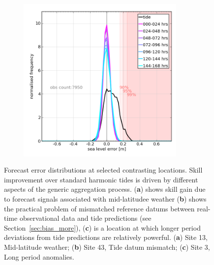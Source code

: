 \begin{figure}[H]
\begin{subfigure}{0.30\textwidth}
    \caption{}
    \end{subfigure}
    \begin{subfigure}{0.30\textwidth}
    \includegraphics[width=0.9\textwidth]{figures/plots/0003_verify_pdf.png}
    \caption{}
    \end{subfigure}
    \caption{ Forecast error distributions at selected contrasting locations. Skill improvement over standard harmonic tides is driven by different aspects of the generic aggregation process. (\textbf{a}) shows skill gain due to forecast signals associated with mid-latitudee weather (\textbf{b}) shows the practical problem of mismatched reference datums between real-time observational data and tide predictions (see Section~\ref{sec:bias_more}), (\textbf{c}) is a location at which longer period deviations from tide predictions are relatively powerful. (\textbf{a}) Site 13, Mid-latitude weather; (\textbf{b}) Site 43, Tide datum mismatch; (\textbf{c}) Site 3, Long period anomalies.}\vspace{-17pt}

    \label{fig:pdf}
\end{figure}   


